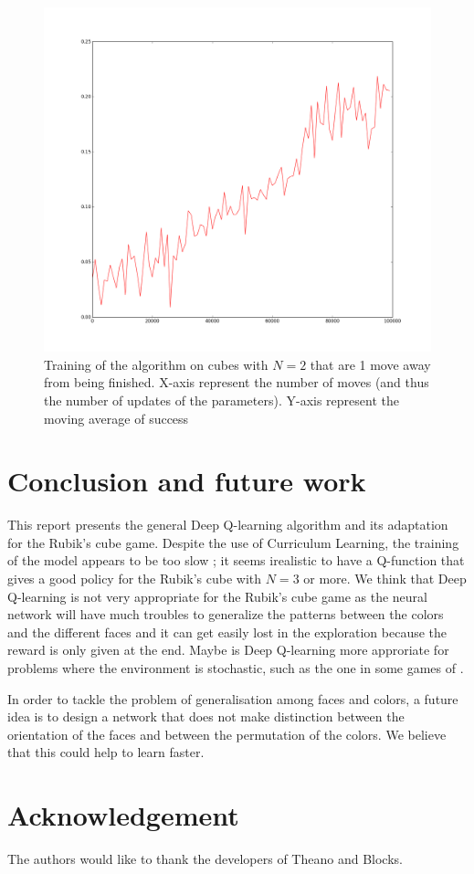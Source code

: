 \documentclass{article} %
\begin{document}
\begin{figure}[h]
\begin{center}
   \includegraphics[scale=0.4]{firstfigure.png}
   \caption{\label{firstfigure} Training of the algorithm on cubes with $N=2$ that are 1 move away from being finished. X-axis represent the number of moves (and thus the number of updates of the parameters). Y-axis represent the moving average of success}
   \end{center}
\end{figure}

\section{Conclusion and future work}
This report presents the general Deep Q-learning algorithm and its adaptation for the Rubik's cube game. Despite the use of Curriculum Learning, the training of the model appears to be too slow ; it seems irealistic to have a Q-function that gives a good policy for the Rubik's cube with $N=3$ or more. We think that Deep Q-learning is not very appropriate for the Rubik's cube game as the neural network will have much troubles to generalize the patterns between the colors and the different faces and it can get easily lost in the exploration because the reward is only given at the end. Maybe is Deep Q-learning more approriate for problems where the environment is stochastic, such as the one in some games of \cite{deepmind}.

In order to tackle the problem of generalisation among faces and colors, a future idea is to design a network that does not make distinction between the orientation of the faces and between the permutation of the colors. We believe that this could help to learn faster.

\section{Acknowledgement}
The authors would like to thank the developers of Theano and Blocks.




\end{document}
